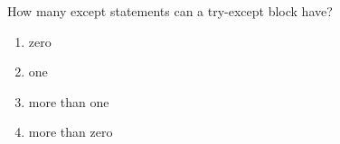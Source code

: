 \question
How many except statements can a try-except block have?

\begin{enumerate}
\item zero
\item one
\item more than one
\item more than zero
\end{enumerate}

